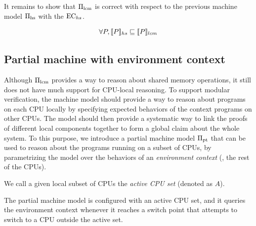 It remains to show that $\mach{lcm}$ is correct with
respect to the previous machine model $\mach{hs}$
with the $\ectxtc_{hs}$.
\begin{lemma}\vspace{-2pt}
{\small \[
\forall P, \sem{hs}{P}\machrel \sem{lcm}{P}\]}
\vspace{-20pt}
\end{lemma}

\subsection{Partial machine with environment context}

Although $\mach{lcm}$ provides a way to reason about shared memory operations,
it still does not have much support for CPU-local reasoning.
To support modular verification, the machine model should provide
a way to reason about programs on each CPU locally by specifying
expected behaviors of the context programs on other CPUs. The model
should then provide a systematic
way to link the proofs of different local components together to form a global
claim about the whole system. To this purpose, we introduce a partial
machine model $\mach{pt}$ that can be used to reason about the
programs running on a subset of CPUs, by
parametrizing the model over the behaviors of an \emph{environment context}
(\ie, the rest of the CPUs).

We call a given local subset of CPUs the \emph{active CPU set} 
(denoted as $A$).
The partial machine model is configured with an active CPU set,
and it queries the environment context whenever it reaches a switch point
that attempts to switch to a CPU outside the active set.

\vspace{-2pt}
